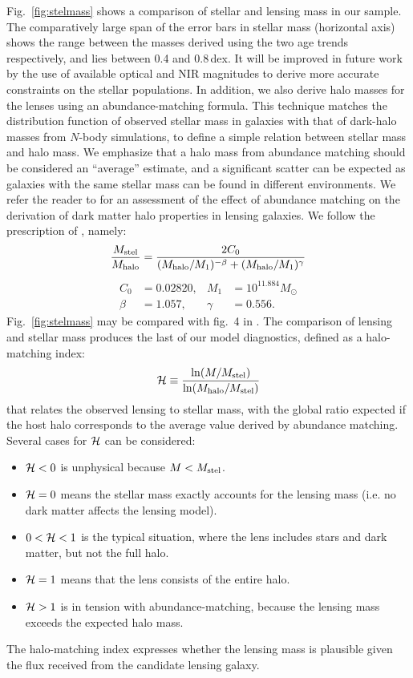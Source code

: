 Fig.~\ref{fig:stelmass} shows a comparison of stellar and lensing mass
in our sample.  The comparatively large span of the error bars in
stellar mass (horizontal axis) shows the range between the masses
derived using the two age trends respectively, and lies between 0.4 and
0.8\,dex.  It will be improved in future work by the use of available
optical and NIR magnitudes to derive more accurate constraints on the
stellar populations.  In addition, we also derive halo masses for the
lenses using an abundance-matching formula.  This technique matches
the distribution function of observed stellar mass in galaxies with
that of dark-halo masses from $N$-body simulations, to define  a simple
relation between stellar mass and halo mass.  We emphasize that a halo
mass from abundance matching should be considered an ``average''
estimate, and a significant scatter can be expected as galaxies with
the same stellar mass can be found in different environments. We refer
the reader to \cite{2012MNRAS.424..104L} for an assessment of the
effect of abundance matching on the derivation of dark matter halo
properties in lensing galaxies. We follow the prescription of
\citet{2010ApJ...710..903M}, namely:
\begin{equation}
    \frac{M_\text{stel}}{M_\text{halo}} = \frac{2C_0}{(M_\text{halo}/M_1)^{-\beta} +
                                     (M_\text{halo}/M_1)^\gamma}
\end{equation}
\begin{align*}
    C_0 &= 0.02820, & M_1 &= 10^{11.884} M_\odot \\
    \beta &= 1.057, & \gamma &= 0.556.
\end{align*}
Fig.~\ref{fig:stelmass} may be compared with fig.~4 in
\cite{2011ApJ...734...69M}.
The comparison of lensing and stellar mass produces the last 
of our model diagnostics, defined as a halo-matching index:
\begin{equation}
\mathcal{H} \equiv \frac{\ln(M/M_\text{stel})}{\ln(M_\text{halo}/M_\text{stel})}
\end{equation}
that relates the observed lensing to stellar mass, with the
global ratio expected if the host halo corresponds to the
average value derived by abundance matching. Several cases
for $\mathcal{H}$ can be considered:
\begin{itemize}
\item $\mathcal{H} < 0$ is unphysical because $M<M_\text{stel}$.
\item $\mathcal{H} = 0$ means the stellar mass exactly accounts for the
  lensing mass (i.e. no dark matter affects the lensing model).
\item $0 < \mathcal{H} < 1$ is the typical situation, where the lens
  includes stars and dark matter, but not the full halo.
\item $\mathcal{H} = 1$ means that the lens consists of the entire halo.
\item $\mathcal{H} > 1$ is in tension with abundance-matching, because the
  lensing mass exceeds the expected halo mass.
\end{itemize}
The halo-matching index expresses whether the lensing mass is
plausible given the flux received from the candidate lensing galaxy.

